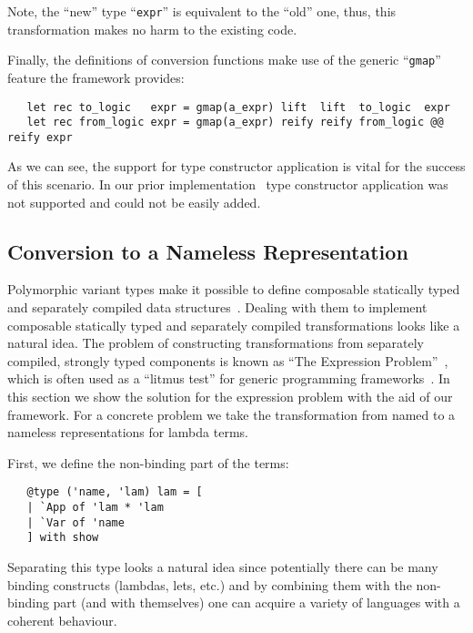 Note, the ``new'' type ``\lstinline{expr}'' is equivalent to the ``old'' one, thus, this transformation makes no
harm to the existing code.

Finally, the definitions of conversion functions make use of the generic ``\lstinline{gmap}'' feature the
framework provides:

\begin{lstlisting}
   let rec to_logic   expr = gmap(a_expr) lift  lift  to_logic  expr
   let rec from_logic expr = gmap(a_expr) reify reify from_logic @@ reify expr
\end{lstlisting}

As we can see, the support for type constructor application is vital for the success of this scenario. In our prior
implementation~\cite{TransformationObjects} type constructor application was not supported and could not be easily added.

\subsection{Conversion to a Nameless Representation}

Polymorphic variant types make it possible to define composable statically typed and separately compiled data structures~\cite{PolyVarReuse}.
Dealing with them to implement composable statically typed and separately compiled transformations looks like a natural idea. The problem of
constructing transformations from separately compiled, strongly typed components is known as ``The Expression Problem''~\cite{ExpressionProblem}, which
is often used as a ``litmus test'' for generic programming frameworks~\cite{ObjectAlgebras,ALaCarte}. In this section we show the solution for
the expression problem with the aid of our framework. For a concrete problem we take the transformation from named to a nameless representations
for lambda terms.

First, we define the non-binding part of the terms:

\begin{lstlisting}
   @type ('name, 'lam) lam = [
   | `App of 'lam * 'lam
   | `Var of 'name
   ] with show
\end{lstlisting}

Separating this type looks a natural idea since potentially there can be many binding constructs (lambdas, lets, etc.) and by combining them
with the non-binding part (and with themselves) one can acquire a variety of languages with a coherent behaviour.

